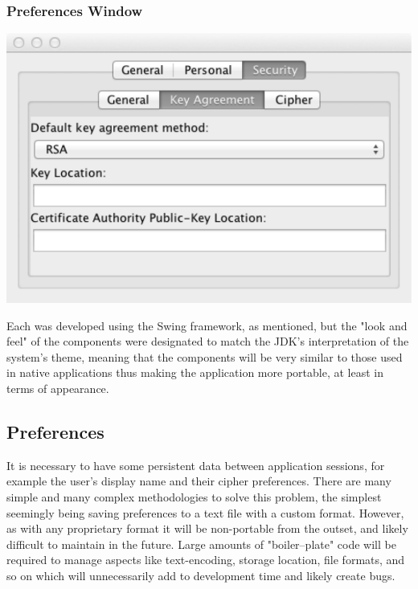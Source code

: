     \subsubsection{Preferences Window}
    
    \begin{center}
        \includegraphics[scale=0.7]{./Figures/Ch6/6-3-1-2-preferences_window.pdf}
     \end{center}
    
    Each was developed using the Swing framework, as mentioned, but the "look and feel" of the components were designated to match the JDK's interpretation of the system's theme, meaning that the components will be very similar to those used in native applications thus making the application more portable, at least in terms of appearance. 
    
  \subsection{Preferences}
  
  It is necessary to have some persistent data between application sessions, for example the user's display name and their cipher preferences. There are many simple and many complex methodologies to solve this problem, the simplest seemingly being saving preferences to a text file with a custom format. However, as with any proprietary format it will be non-portable from the outset, and likely difficult to maintain in the future. Large amounts of "boiler--plate" code will be required to manage aspects like text-encoding, storage location, file formats, and so on which will unnecessarily add to development time and likely create bugs.
  
